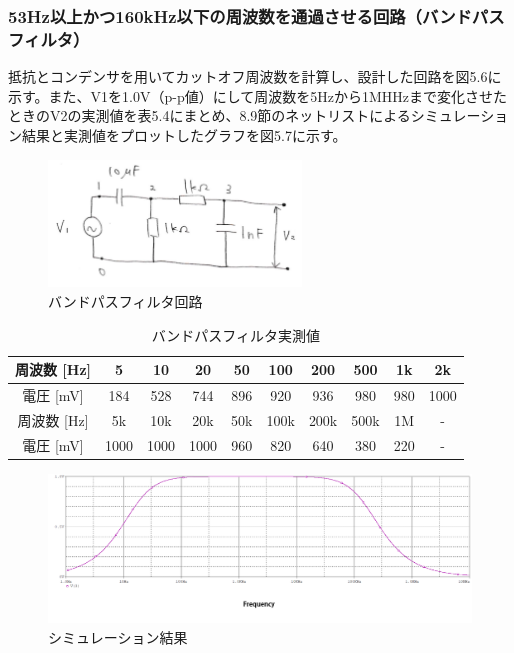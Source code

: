\documentclass{jlreq}
\numberwithin{equation}{section}
\begin{document}
\subsubsection{53Hz以上かつ160kHz以下の周波数を通過させる回路（バンドパスフィルタ）}
抵抗とコンデンサを用いてカットオフ周波数を計算し、設計した回路を図5.6に示す。また、V1を1.0V（p-p値）にして周波数を5Hzから1MHHzまで変化させたときのV2の実測値を表5.4にまとめ、8.9節のネットリストによるシミュレーション結果と実測値をプロットしたグラフを図5.7に示す。

\begin{figure}[H]
  \centering
  \includegraphics[width=0.6\textwidth]{assets/bandpasskairo.png}
  \caption{バンドパスフィルタ回路}
\end{figure}

\begin{table}[H]
  \centering
    \caption{バンドパスフィルタ実測値}
    \begin{tabular}{|c|c|c|c|c|c|c|c|c|c|}
      \hline
      周波数 [Hz] & 5 & 10 & 20 & 50 & 100 & 200 & 500 & 1k & 2k \\ \hline
      電圧 [mV] & 184 & 528 & 744 & 896 & 920 & 936 & 980 & 980 & 1000 \\ \hline
      \hline
      周波数 [Hz] & 5k & 10k & 20k & 50k & 100k & 200k & 500k & 1M & - \\ \hline
      電圧 [mV] & 1000 & 1000 & 1000 & 960 & 820 & 640 & 380 & 220 & - \\ \hline
    \end{tabular}
\end{table}

\begin{figure}[H]
  \centering
  \includegraphics[width=\textwidth]{assets/bandpass.png}
  \caption{シミュレーション結果}
\end{figure}
\end{document}
